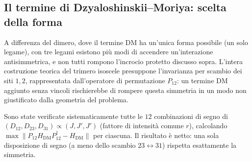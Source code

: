 \documentclass[11pt,a4paper]{article}
\begin{document}
\subsection{Il termine di Dzyaloshinskii--Moriya: scelta della forma}
\label{sec:dm}

A differenza del dimero, dove il termine DM ha un'unica forma possibile
(un solo legame), con tre legami esistono più modi di accendere
un'interazione antisimmetrica, e non tutti rompono l'incrocio protetto
discusso sopra. L'intera costruzione teorica del trimero isoscele
presuppone l'invarianza per scambio dei siti $1,2$, rappresentata
dall'operatore di permutazione $P_{12}$: un termine DM aggiunto senza
vincoli rischierebbe di rompere questa simmetria in un modo non
giustificato dalla geometria del problema.

Sono state verificate sistematicamente tutte le $12$ combinazioni di
segno di $(D_{12},D_{23},D_{31})\propto(J,J',J')$ (fattore di intensità
comune $r$), calcolando $\max\lVert P_{12}H_\text{DM}P_{12}^\dagger -
H_\text{DM}\rVert$ per ciascuna. Il risultato è netto: una sola
disposizione di segno (a meno dello scambio $23\leftrightarrow31$)
rispetta esattamente la simmetria.
\end{document}
